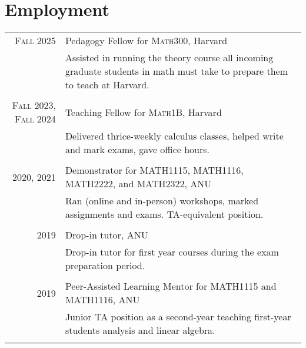 \documentclass[a4paper,11pt]{article} %
\begin{document}

\section{Employment}

\begin{tabular}{r|p{12cm}}

\textsc{Fall 2025} & Pedagogy Fellow for \textsc{Math300}, Harvard \emph{}\\
& \footnotesize{Assisted in running the theory course all incoming graduate students in math must take to prepare them to teach at Harvard.}\\
\multicolumn{2}{c}{} \\


\textsc{Fall 2023, Fall 2024} & Teaching Fellow for \textsc{Math1B}, Harvard \emph{}\\
& \footnotesize{Delivered thrice-weekly calculus classes, helped write and mark exams, gave office hours.}\\
\multicolumn{2}{c}{} \\


\textsc{2020, 2021} & Demonstrator for \textsc{MATH1115, MATH1116, MATH2222}, and \textsc{MATH2322}, ANU \emph{}\\
& \footnotesize{Ran (online and in-person) workshops, marked assignments and exams. TA-equivalent position.}\\
\multicolumn{2}{c}{} \\


\textsc{2019} & Drop-in tutor, ANU \emph{}\\
& \footnotesize{Drop-in tutor for first year courses during the exam preparation period.}\\
\multicolumn{2}{c}{} \\


\textsc{2019} & Peer-Assisted Learning Mentor for \textsc{MATH1115} and \textsc{MATH1116}, ANU \emph{}\\
& \footnotesize{Junior TA position as a second-year teaching first-year students analysis and linear algebra.}\\
\multicolumn{2}{c}{}

\end{tabular}
\end{document}
